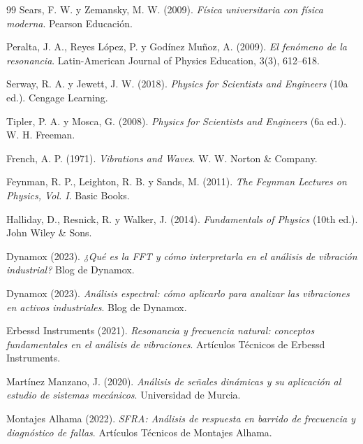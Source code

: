 \documentclass[10pt]{article}
\begin{document}
\begin{thebibliography}{99}
Sears, F. W. y Zemansky, M. W. (2009).
\textit{Física universitaria con física moderna}.
Pearson Educación.

Peralta, J. A., Reyes López, P. y Godínez Muñoz, A. (2009).
\textit{El fenómeno de la resonancia}.
Latin-American Journal of Physics Education, 3(3), 612--618.

Serway, R. A. y Jewett, J. W. (2018).
\textit{Physics for Scientists and Engineers} (10a ed.).
Cengage Learning.

Tipler, P. A. y Mosca, G. (2008).
\textit{Physics for Scientists and Engineers} (6a ed.).
W. H. Freeman.

French, A. P. (1971).
\textit{Vibrations and Waves}.
W. W. Norton \& Company.

Feynman, R. P., Leighton, R. B. y Sands, M. (2011).
\textit{The Feynman Lectures on Physics, Vol. I}.
Basic Books.

Halliday, D., Resnick, R. y Walker, J. (2014).
\textit{Fundamentals of Physics} (10th ed.).
John Wiley \& Sons.



Dynamox (2023).
\textit{¿Qué es la FFT y cómo interpretarla en el análisis de vibración industrial?}
Blog de Dynamox.

Dynamox (2023).
\textit{Análisis espectral: cómo aplicarlo para analizar las vibraciones en activos industriales}.
Blog de Dynamox.

Erbessd Instruments (2021).
\textit{Resonancia y frecuencia natural: conceptos fundamentales en el análisis de vibraciones}.
Artículos Técnicos de Erbessd Instruments.

Martínez Manzano, J. (2020).
\textit{Análisis de señales dinámicas y su aplicación al estudio de sistemas mecánicos}.
Universidad de Murcia.

Montajes Alhama (2022).
\textit{SFRA: Análisis de respuesta en barrido de frecuencia y diagnóstico de fallas}.
Artículos Técnicos de Montajes Alhama.


\end{thebibliography}
\end{document}
